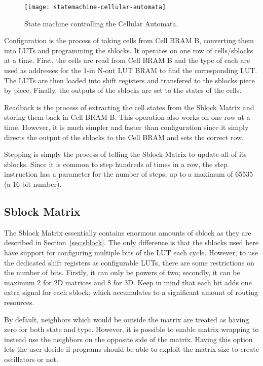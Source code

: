 \begin{figure}[!ht]
    \centering
    \texttt{[image: statemachine-cellular-automata]}
    \caption[Cellular Automata state machine]{
        State machine controlling the Cellular Automata.
    }
    \label{fig:statemachine-cellular-automata}
\end{figure}

Configuration is the process of taking cells from Cell BRAM B, converting them into LUTs and programming the sblocks.
It operates on one row of cells/sblocks at a time.
First, the cells are read from Cell BRAM B and the type of each are used as addresses for the 1-in N-out LUT BRAM to find the corresponding LUT.
The LUTs are then loaded into shift registers and transfered to the sblocks piece by piece.
Finally, the outputs of the sblocks are set to the states of the cells.

Readback is the process of extracting the cell states from the Sblock Matrix and storing them back in Cell BRAM B.
This operation also works on one row at a time.
However, it is much simpler and faster than configuration since it simply directs the output of the sblocks to the Cell BRAM and sets the correct row.

Stepping is simply the process of telling the Sblock Matrix to update all of its sblocks.
Since it is common to step hundreds of times in a row, the step instruction has a parameter for the number of steps, up to a maximum of 65535 (a 16-bit number).

\subsection{Sblock Matrix}

The Sblock Matrix essentially contains enormous amounts of sblock as they are described in Section~\ref{sec:sblock}.
The only difference is that the sblocks used here have support for configuring multiple bits of the LUT each cycle.
However, to use the dedicated shift registers as configurable LUTs, there are some restrictions on the number of bits.
Firstly, it can only be powers of two; secondly, it can be maximum 2 for 2D matrices and 8 for 3D.
Keep in mind that each bit adds one extra signal for each sblock, which accumulates to a significant amount of routing resources.

By default, neighbors which would be outside the matrix are treated as having zero for both state and type.
However, it is possible to enable matrix wrapping to instead use the neighbors on the opposite side of the matrix.
Having this option lets the user decide if programs should be able to exploit the matrix size to create oscillators or not.

